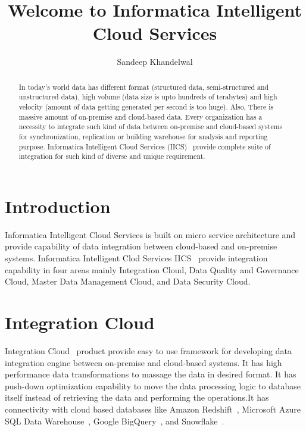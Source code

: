 \title{Welcome to Informatica Intelligent Cloud Services}

\author{Sandeep Khandelwal}

\renewcommand{\shortauthors}{S. Khandelwal}

\begin{abstract}
	
In today's world data has different format (structured data,
semi-structured and unstructured data), high volume (data size is upto
hundreds of terabytes) and high velocity (amount of data getting
generated per second is too huge). Also, There is massive amount of
on-premise and cloud-based data.  Every organization has a necessity
to integrate such kind of data between on-premise and cloud-based
systems for synchronization, replication or building warehouse for
analysis and reporting purpose. Informatica Intelligent Cloud Services
(IICS)~\cite{hid-sp18-511-iics} provide complete suite of integration for such kind of diverse
and unique requirement.

\end{abstract}



\maketitle


\section{Introduction}

Informatica Intelligent Cloud Services is built on micro service
architecture and provide capability of data integration between
cloud-based and on-premise systems. Informatica Intelligent Clod
Services IICS~\cite{hid-sp18-511-iics} provide integration capability
in four areas mainly Integration Cloud, Data Quality and Governance
Cloud, Master Data Management Cloud, and Data Security Cloud.

\section{Integration Cloud}

Integration Cloud~\cite{hid-sp18-511-iics} product provide easy to use framework for developing data integration engine between on-premise and cloud-based systems. It has high performance data transformations to massage the data in desired format. It has push-down optimization capability to move the data processing logic to database itself instead of retrieving the data and performing the operations.It has connectivity with cloud based databases like Amazon Redshift~\cite{hid-sp18-511-aws-redshift}, Microsoft Azure SQL Data Warehouse~\cite{hid-sp18-511-ms-azure-sql}, Google BigQuery~\cite{hid-sp18-511-google-bigquery}, and Snowflake~\cite{hid-sp18-511-snowflake}.

